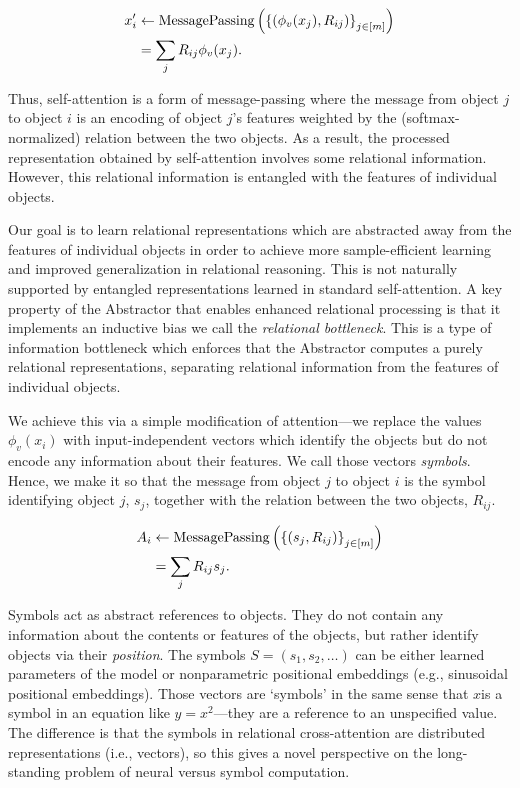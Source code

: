 \begin{equation}\label{eq:self_attn_message_passing}
    \begin{split}
        x_i' &\gets \mathrm{MessagePassing}\left(\left\{(\phi_v(x_j), R_{ij})\right\}_{j \in [m]}\right)\\
        &= \sum_{j} R_{ij} \phi_v(x_j).
    \end{split}
\end{equation}

Thus, self-attention is a form of message-passing where the message from object $j$ to object $i$ is an encoding of object $j$'s features weighted by the (softmax-normalized) relation between the two objects. As a result, the processed representation obtained by self-attention involves some relational information. However, this relational information is entangled with the features of individual objects.

Our goal is to learn relational representations which are abstracted away from the features of individual objects in order to achieve more sample-efficient learning and improved generalization in relational reasoning. This is not naturally supported by entangled representations learned in standard self-attention. A key property of the Abstractor that enables enhanced relational processing is that it implements an inductive bias we call the \textit{relational bottleneck}. This is a type of information bottleneck which enforces that the Abstractor computes a purely relational representations, separating relational information from the features of individual objects.

We achieve this via a simple modification of attention---we replace the values $\phi_v(x_i)$ with input-independent vectors which identify the objects but do not encode any information about their features. We call those vectors \textit{symbols}. Hence, we make it so that the message from object $j$ to object $i$ is the symbol identifying object $j$, $s_j$, together with the relation between the two objects, $R_{ij}$.

\begin{equation}\label{eq:relational_crossattn_message_passing}
    \begin{split}
        A_i &\gets \mathrm{MessagePassing}\left(\left\{(s_j, R_{ij})\right\}_{j \in [m]}\right)\\
        &= \sum_{j} R_{ij} s_j.
    \end{split}
\end{equation}

Symbols act as abstract references to objects. They do not contain any information about the contents or features of the objects, but rather identify objects via their \textit{position}. The symbols $S = (s_1, s_2, \ldots)$ can be either learned parameters of the model or nonparametric positional embeddings (e.g., sinusoidal positional embeddings). Those vectors are `symbols' in the same sense that $x$is a symbol in an equation like $y = x^2$---they are a reference to an unspecified value. The difference is that the symbols in relational cross-attention are distributed representations (i.e., vectors), so this gives a novel perspective on the long-standing problem of neural versus symbol computation.


